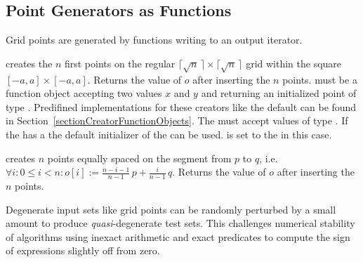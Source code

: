 \subsection{Point Generators as Functions}


Grid points are generated by functions writing to an output iterator.

\def\ccLongParamLayout{\ccTrue}
{ creates the $n$ first points on the regular $\lceil\sqrt{n}\,\rceil
    \times \lceil  \sqrt{n}\,\rceil$ grid within the square
    $[-a,a]\times [-a,a]$. Returns the value of $o$ after inserting
    the $n$ points. 
    \ccPrecond {} must be a function object accepting two
     values $x$ and $y$ and returning an initialized point
     of type . Predifined implementations for these
    creators like the default can be found in
    Section~\ref{sectionCreatorFunctionObjects}. The
     must accept values of type . If the
     has a  the default
    initializer of the  can be used.  is set to
    the  in this case.}
\def\ccLongParamLayout{\ccFalse}


{ creates $n$ points equally spaced on the segment from $p$ to $q$,
    i.e.~$\forall i: 0 \le i < n: o[i] := \frac{n-i-1}{n-1}\, p +
    \frac{i}{n-1}\, q$. Returns the value of $o$ after inserting
    the $n$ points.}


Degenerate input sets like grid points can be randomly perturbed by a
small amount to produce {\em quasi}-degenerate test sets. This
challenges numerical stability of algorithms using inexact arithmetic and
exact predicates to compute the sign of expressions slightly off from zero.

